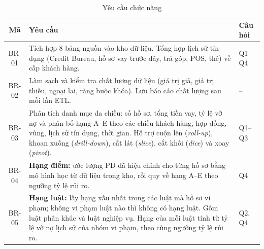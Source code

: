 \begin{table}[H]
	\centering
	\caption{Yêu cầu chức năng}
	\label{tab:functional-requirements}
	\footnotesize
	\begin{tabular}{c p{13cm} l}
		\toprule
		\textbf{Mã} & \textbf{Yêu cầu}                                                                                                                                                                                                                                                                                                                 & \textbf{Câu hỏi} \\
		\midrule
		BR-01       & Tích hợp $8$ bảng nguồn vào kho dữ liệu. Tổng hợp lịch sử tín dụng (Credit Bureau, hồ sơ vay trước đây, trả góp, POS, thẻ) về cấp khách hàng.                                                                                                                                                                                    & Q1--Q4           \\
		BR-02       & Làm sạch và kiểm tra chất lượng dữ liệu (giá trị giả, giá trị thiếu, ngoại lai, ràng buộc khóa). Lưu báo cáo chất lượng sau mỗi lần ETL.                                                                                                                                                                                         & --               \\
		BR-03       & Phân tích danh mục đa chiều: số hồ sơ, tổng tiền vay, tỷ lệ vỡ nợ và phân bố hạng A--E theo các chiều khách hàng, hợp đồng, vùng, lịch sử tín dụng, thời gian. Hỗ trợ cuộn lên (\textit{roll-up}), khoan xuống (\textit{drill-down}), cắt lát (\textit{slice}), cắt khối (\textit{dice}) và xoay (\textit{pivot}).               & Q1--Q3           \\
		BR-04       & \textbf{Hạng điểm:} ước lượng PD đã hiệu chỉnh cho từng hồ sơ bằng mô hình học từ dữ liệu trong kho, rồi quy về hạng A--E theo ngưỡng tỷ lệ rủi ro.                                                                                                                                                                              & Q4               \\
		BR-05       & \textbf{Hạng luật:} lấy hạng xấu nhất trong các luật mà hồ sơ vi phạm; không vi phạm luật nào thì không có hạng luật. Gồm luật phân khúc và luật nghiệp vụ. Hạng của mỗi luật tính từ tỷ lệ vỡ nợ lịch sử của nhóm vi phạm, theo cùng ngưỡng tỷ lệ rủi ro.                                                                       & Q2, Q4           \\

\end{tabular}
\end{table}
